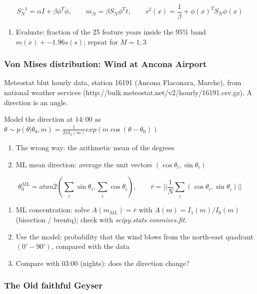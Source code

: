 \documentclass{article}
\begin{document}
\[S_N^{-1} = \alpha I + \beta \phi^T \phi, \qquad m_N = \beta S_N \phi^T t,
\qquad s^2(x) = \frac{1}{\beta} + \phi (x)^T S_N \phi(x)\]

\begin{enumerate}
\def\labelenumi{\arabic{enumi}.}
\setcounter{enumi}{4}
\tightlist
\item
  Evaluate: fraction of the 25 feature years inside the 95\% band
  \(m(x) +- 1.96
  s(s)\); repeat for \(M = 1, 3\)
\end{enumerate}

\subsubsection{Von Mises distribution: Wind at Ancona
Airport}\label{von-mises-distribution-wind-at-ancona-airport}

Meteostat blut hourly data, station 16191 (Ancona Flaconara, Marche),
from national weather services
(http://bulk.meteostat.net/v2/hourly/16191.csv.gz). A direction is an
angle.

Model the direction at \(14:00\) as
\(\theta \sim p(\theta | \theta_0, m) =
\frac{1}{2\pi I_0 (m)} exp(m \cos (\theta - \theta_0))\)

\begin{enumerate}
\def\labelenumi{\arabic{enumi}.}
\item
  The wrong way: the arithmetic mean of the degrees
\item
  ML mean direction: average the unit vectors
  \((\cos \theta_i, \sin \theta_i)\)
\end{enumerate}

\[\theta_0^{ML} = atan2 (\sum_i \sin \theta_i, \sum_i \cos \theta_i), \qquad
\bar{r} = ||\frac{1}{N} \sum_i (\cos \theta_i, \sin \theta_i)||\]

\begin{enumerate}
\def\labelenumi{\arabic{enumi}.}
\setcounter{enumi}{2}
\item
  ML concentration: solve \(A(m_{ML}) = \bar{r}\) with
  \(A(m) = I_1(m) / I_0(m)\) (bisection / brentq); check with
  \emph{scipy.stats.vonmises.fit}.
\item
  Use the model: probability that the wind blows from the north-east
  quadrant \((0'-90')\), compared with the data
\item
  Compare with 03:00 (nights): does the direction change?
\end{enumerate}

\subsubsection{The Old faithful Geyser}\label{the-old-faithful-geyser}
\end{document}
